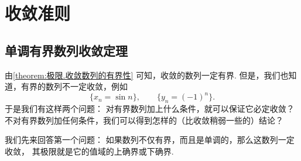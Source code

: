 \section{收敛准则}
\subsection{单调有界数列收敛定理}
由\cref{theorem:极限.收敛数列的有界性} 可知，收敛的数列一定有界.
但是，我们也知道，有界的数列不一定收敛，例如\begin{equation*}
	\{ x_n = \sin n \}, \qquad
	\{ y_n = (-1)^n \}.
\end{equation*}
于是我们有这样两个问题：
对有界数列加上什么条件，就可以保证它必定收敛？
不对有界数列加任何条件，我们可以得到怎样的（比收敛稍弱一些的）结论？

我们先来回答第一个问题：
如果数列不仅有界，而且是单调的，那么这数列一定收敛，
其极限就是它的值域的上确界或下确界.

